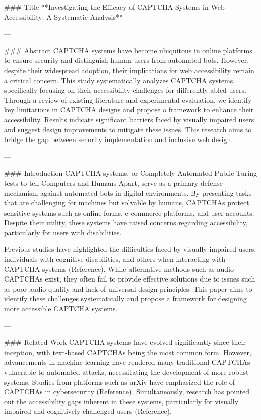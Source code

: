 ### Title  
**Investigating the Efficacy of CAPTCHA Systems in Web Accessibility: A Systematic Analysis**

---

### Abstract  
CAPTCHA systems have become ubiquitous in online platforms to ensure security and distinguish human users from automated bots. However, despite their widespread adoption, their implications for web accessibility remain a critical concern. This study systematically analyzes CAPTCHA systems, specifically focusing on their accessibility challenges for differently-abled users. Through a review of existing literature and experimental evaluation, we identify key limitations in CAPTCHA designs and propose a framework to enhance their accessibility. Results indicate significant barriers faced by visually impaired users and suggest design improvements to mitigate these issues. This research aims to bridge the gap between security implementation and inclusive web design.

---

### Introduction  
CAPTCHA systems, or Completely Automated Public Turing tests to tell Computers and Humans Apart, serve as a primary defense mechanism against automated bots in digital environments. By presenting tasks that are challenging for machines but solvable by humans, CAPTCHAs protect sensitive systems such as online forms, e-commerce platforms, and user accounts. Despite their utility, these systems have raised concerns regarding accessibility, particularly for users with disabilities.

Previous studies have highlighted the difficulties faced by visually impaired users, individuals with cognitive disabilities, and others when interacting with CAPTCHA systems (Reference). While alternative methods such as audio CAPTCHAs exist, they often fail to provide effective solutions due to issues such as poor audio quality and lack of universal design principles. This paper aims to identify these challenges systematically and propose a framework for designing more accessible CAPTCHA systems.

---

### Related Work  
CAPTCHA systems have evolved significantly since their inception, with text-based CAPTCHAs being the most common form. However, advancements in machine learning have rendered many traditional CAPTCHAs vulnerable to automated attacks, necessitating the development of more robust systems. Studies from platforms such as arXiv have emphasized the role of CAPTCHAs in cybersecurity (Reference). Simultaneously, research has pointed out the accessibility gaps inherent in these systems, particularly for visually impaired and cognitively challenged users (Reference).

